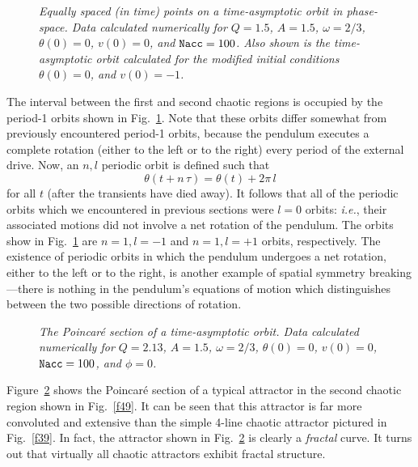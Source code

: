 \begin{figure}
\epsfysize=2.25in
\centerline{}
\caption{\em Equally spaced (in time) points on a time-asymptotic orbit in phase-space. Data 
calculated numerically for $Q=1.5$, $A=1.5$, $\omega=2/3$, $\theta(0)=0$,
$v(0)=0$, and ${\tt Nacc} = 100$.
Also shown is the time-asymptotic orbit calculated for the modified initial
conditions $\theta(0)=0$, and
$v(0)=-1$.}\label{f50}
\end{figure}

The interval
between the first and second chaotic regions is occupied by the period-1 orbits shown in
Fig.~\ref{f50}. Note that these orbits differ somewhat  from previously encountered period-1 orbits,
 because the pendulum executes a complete rotation (either to
the left or to the right) every period of the external drive. 
Now, an $n,l$ periodic orbit is defined such that
$$
\theta(t+n\,\tau) = \theta(t) + 2\pi\,l
$$
for all $t$ (after the transients have died away). It follows that all of the periodic orbits which we 
encountered in previous sections were $l=0$ orbits: {\em i.e.}, their  associated motions did
not involve a net rotation of the pendulum. The orbits show in Fig.~\ref{f50}
are $n=1, l=-1$ and $n=1, l=+1$ orbits, respectively. The existence of periodic
orbits in which the pendulum undergoes a net rotation, either to the left or to the right,
is another example of spatial symmetry breaking---there is nothing in the pendulum's equations
of motion which distinguishes between the two possible directions of rotation.

\begin{figure}
\epsfysize=3in
\centerline{}
\caption{\em The Poincar\'{e} section of a time-asymptotic orbit. Data
calculated numerically for $Q=2.13$, $A=1.5$, $\omega=2/3$, $\theta(0)=0$,
$v(0)=0$, ${\tt Nacc} = 100$, and $\phi=0$. }\label{f51}
\end{figure}

Figure~\ref{f51} shows the Poincar\'{e} section of a typical  attractor in the
second chaotic region shown in Fig.~\ref{f49}. It can be seen that this attractor is far more
convoluted and extensive than the simple 4-line chaotic attractor pictured in Fig.~\ref{f39}. 
In fact, the attractor shown in Fig.~\ref{f51} is clearly a {\em fractal} curve. It turns
out that virtually all chaotic attractors exhibit fractal structure.

